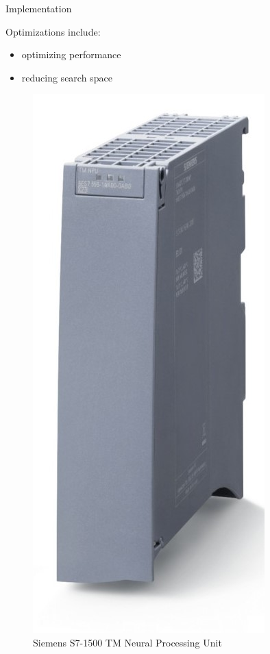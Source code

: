 \documentclass[en]{sdqbeamer}
\begin{document}
	\begin{frame}{Implementation}
		\begin{minipage}[b]{0.45\paperwidth}
			Optimizations include:
			\begin{itemize}
				\item optimizing performance \cite{szegedy2015going} 
				\item reducing search space \cite{zhang2018ffs}
			\end{itemize}
		\end{minipage}
		\vrule{}
		\begin{minipage}{0.45\paperwidth}
			\begin{figure}
				\centering
				\includegraphics[width= 0.13\paperwidth]{pictures/siemens_npu.png}
				\caption{Siemens S7-1500 TM Neural Processing Unit \cite{siemensnpu_pic}}
			\end{figure}
		\end{minipage}
	\end{frame}
\end{document}
